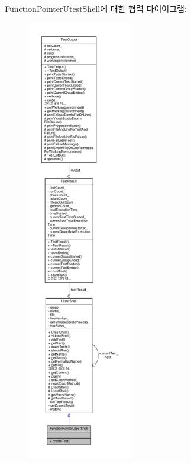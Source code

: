 Function\+Pointer\+Utest\+Shell에 대한 협력 다이어그램\+:
\nopagebreak
\begin{figure}[H]
\begin{center}
\leavevmode
\includegraphics[height=550pt]{class_function_pointer_utest_shell__coll__graph}
\end{center}
\end{figure}

